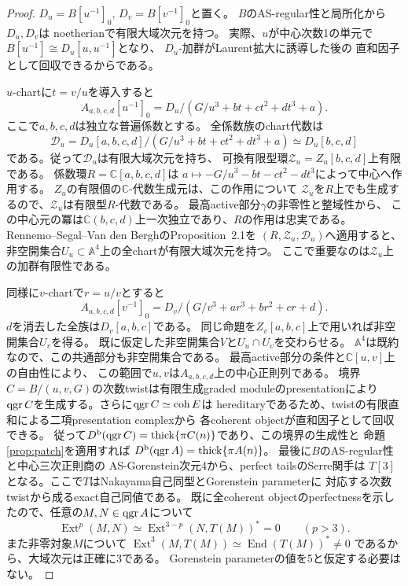 \begin{proof}
$D_u=B[u^{-1}]_0$, $D_v=B[v^{-1}]_0$と置く。
$B$のAS-regular性と局所化から$D_u,D_v$は
noetherianで有限大域次元を持つ。
実際、$u$が中心次数1の単元で
$B[u^{-1}]\cong D_u[u,u^{-1}]$となり、
$D_u$-加群がLaurent拡大に誘導した後の
直和因子として回収できるからである。

$u$-chartに$t=v/u$を導入すると
\[
A_{a,b,c,d}[u^{-1}]_0
=D_u/(G/u^3+bt+ct^2+dt^3+a).
\]
ここで$a,b,c,d$は独立な普遍係数とする。
全係数族のchart代数は
\[
\mathcal D_u=D_u[a,b,c,d]/(G/u^3+bt+ct^2+dt^3+a)
             \simeq D_u[b,c,d]
\]
である。従って$\mathcal D_u$は有限大域次元を持ち、
可換有限型環$\mathcal Z_u=Z_u[b,c,d]$上有限である。
係数環$R=\mathbb C[a,b,c,d]$は
$a\mapsto-G/u^3-bt-ct^2-dt^3$によって中心へ作用する。
$Z_u$の有限個の$\mathbb C$-代数生成元は、この作用について
$\mathcal Z_u$を$R$上でも生成するので、$\mathcal Z_u$は有限型$R$-代数である。
最高active部分$\gamma$の非零性と整域性から、
この中心元の冪は$\mathbb C(b,c,d)$上一次独立であり、$R$の作用は忠実である。
Rennemo--Segal--Van den BerghのProposition~2.1を
$(R,\mathcal Z_u,\mathcal D_u)$へ適用すると、
非空開集合$U_u\subset\mathbb A^4$上の全chartが有限大域次元を持つ。
ここで重要なのは$\mathcal Z_u$上の加群有限性である。

同様に$v$-chartで$r=u/v$とすると
\[
A_{a,b,c,d}[v^{-1}]_0
=D_v/(G/v^3+ar^3+br^2+cr+d).
\]
$d$を消去した全族は$D_v[a,b,c]$である。
同じ命題を$Z_v[a,b,c]$上で用いれば非空開集合$U_v$を得る。
既に仮定した非空開集合$V$と$U_u\cap U_v$を交わらせる。
$\mathbb A^4$は既約なので、この共通部分も非空開集合である。
最高active部分の条件と$\mathbb C[u,v]$上の自由性により、
この範囲で$u,v$は$A_{a,b,c,d}$上の中心正則列である。
境界$C=B/(u,v,G)$の次数twistは有限生成graded moduleのpresentationにより
$\operatorname{qgr} C$を生成する。さらに$\operatorname{qgr} C\simeq\operatorname{coh}E$は
hereditaryであるため、twistの有限直和による二項presentation complexから
各coherent objectが直和因子として回収できる。
従って$D^{\mathrm b}(\operatorname{qgr} C)=\operatorname{thick}\{\pi C(n)\}$であり、この境界の生成性と
命題\ref{prop:patch}を適用すれば
$D^{\mathrm b}(\operatorname{qgr} A)=\operatorname{thick}\{\pi A(n)\}$。
最後に$B$のAS-regular性と中心三次正則商の
AS-Gorenstein次元4から、perfect tailsのSerre関手は
$T[3]$となる。ここで$T$はNakayama自己同型とGorenstein parameterに
対応する次数twistから成るexact自己同値である。
既に全coherent objectのperfectnessを示したので、任意の$M,N\in\operatorname{qgr} A$について
\[
 \operatorname{Ext}^p(M,N)
 \simeq\operatorname{Ext}^{3-p}(N,T(M))^*=0\qquad(p>3).
\]
また非零対象$M$について
$\operatorname{Ext}^3(M,T(M))\simeq\operatorname{End}(T(M))^*\ne0$
であるから、大域次元は正確に3である。
Gorenstein parameterの値を5と仮定する必要はない。
\end{proof}


